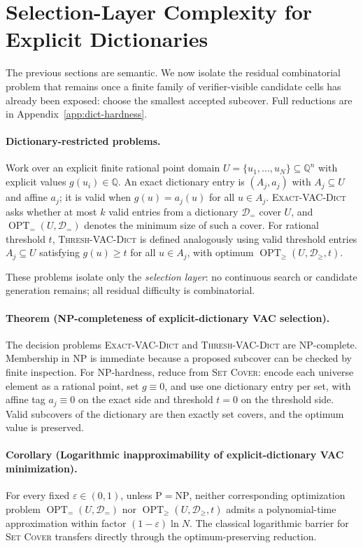 \documentclass{article}
\begin{document}
\section{Selection-Layer Complexity for Explicit Dictionaries}\label{sec:vac-minimization}

The previous sections are semantic. We now isolate the residual combinatorial problem that remains once a finite family of verifier-visible candidate cells has already been exposed: choose the smallest accepted subcover. Full reductions are in Appendix~\ref{app:dict-hardness}.

\paragraph{Dictionary-restricted problems.}
Work over an explicit finite rational point domain $U=\{u_1,\dots,u_N\}\subseteq\mathbb Q^n$ with explicit values $g(u_i)\in\mathbb Q$. An exact dictionary entry is $(A_j,a_j)$ with $A_j\subseteq U$ and affine $a_j$; it is valid when $g(u)=a_j(u)$ for all $u\in A_j$. \textsc{Exact-VAC-Dict} asks whether at most $k$ valid entries from a dictionary $\mathcal D_=$ cover $U$, and $\operatorname{OPT}_{=}(U,\mathcal D_=)$ denotes the minimum size of such a cover. For rational threshold $t$, \textsc{Thresh-VAC-Dict} is defined analogously using valid threshold entries $A_j\subseteq U$ satisfying $g(u)\ge t$ for all $u\in A_j$, with optimum $\operatorname{OPT}_{\ge}(U,\mathcal D_{\ge},t)$.

These problems isolate only the \emph{selection layer}: no continuous search or candidate generation remains; all residual difficulty is combinatorial.

\paragraph{Theorem (NP-completeness of explicit-dictionary VAC selection).}
The decision problems \textsc{Exact-VAC-Dict} and \textsc{Thresh-VAC-Dict} are NP-complete. Membership in NP is immediate because a proposed subcover can be checked by finite inspection. For NP-hardness, reduce from \textsc{Set Cover}: encode each universe element as a rational point, set $g\equiv 0$, and use one dictionary entry per set, with affine tag $a_j\equiv 0$ on the exact side and threshold $t=0$ on the threshold side. Valid subcovers of the dictionary are then exactly set covers, and the optimum value is preserved.

\paragraph{Corollary (Logarithmic inapproximability of explicit-dictionary VAC minimization).}
For every fixed $\varepsilon\in(0,1)$, unless $\mathrm P=\mathrm{NP}$, neither corresponding optimization problem $\operatorname{OPT}_{=}(U,\mathcal D_=)$ nor $\operatorname{OPT}_{\ge}(U,\mathcal D_{\ge},t)$ admits a polynomial-time approximation within factor $(1-\varepsilon)\ln N$. The classical logarithmic barrier for \textsc{Set Cover} transfers directly through the optimum-preserving reduction.
\end{document}
